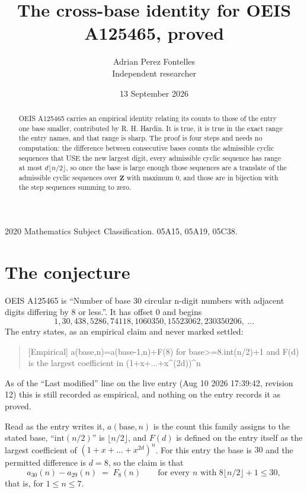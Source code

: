 \documentclass[11pt,a4paper]{article}
\title{The cross-base identity for OEIS A125465, proved}
\author{Adrian Perez Fontelles\\ \small Independent researcher}
\date{13 September 2026}
\theoremstyle{plain}
\theoremstyle{definition}
\begin{document}
\maketitle

\begin{abstract}
OEIS A125465 carries an empirical identity relating its counts to those of the entry one base
smaller, contributed by R. H. Hardin. It is true, it is true in the exact range the entry
names, and that range is sharp. The proof is four steps and needs no computation: the
difference between consecutive bases counts the admissible cyclic sequences that USE the new
largest digit, every admissible cyclic sequence has range at most $d\lfloor n/2\rfloor$, so
once the base is large enough those sequences are a translate of the admissible cyclic
sequences over $\mathbf{Z}$ with maximum $0$, and those are in bijection with the step
sequences summing to zero.
\end{abstract}

\noindent\small 2020 Mathematics Subject Classification. 05A15, 05A19, 05C38.\normalsize

\section{The conjecture}

OEIS A125465 is ``Number of base 30 circular n-digit numbers with adjacent digits differing by 8 or less.''. It has offset $0$ and begins
\[
1, 30, 438, 5286, 74118, 1060350, 15523062, 230350206,\ \dots
\]
The entry states, as an empirical claim and never marked settled:
\begin{quote}
[Empirical] a(base,n)=a(base-1,n)+F(8) for base>=8.int(n/2)+1 and F(d) is the largest coefficient in (1+x+...+x\^{}(2d))\^{}n
\end{quote}
As of the ``Last modified'' line on the live entry (Aug 10 2026 17:39:42, revision 12)
this is still recorded as empirical, and nothing on the entry records it as proved.

Read as the entry writes it, $a(\mathrm{base},n)$ is the count this family assigns to the
stated base, ``$\mathrm{int}(n/2)$'' is $\lfloor n/2\rfloor$, and $F(d)$ is defined on the
entry itself as the largest coefficient of $(1+x+\dots+x^{2d})^{n}$. For this entry
the base is $30$ and the permitted difference is $d=8$, so the claim is that
\[
a_{30}(n)-a_{29}(n)\;=\;F_{8}(n)
\qquad\text{for every } n \text{ with } 8\lfloor n/2\rfloor+1\le30,
\]
that is, for $1\le n\le7$.
\end{document}
